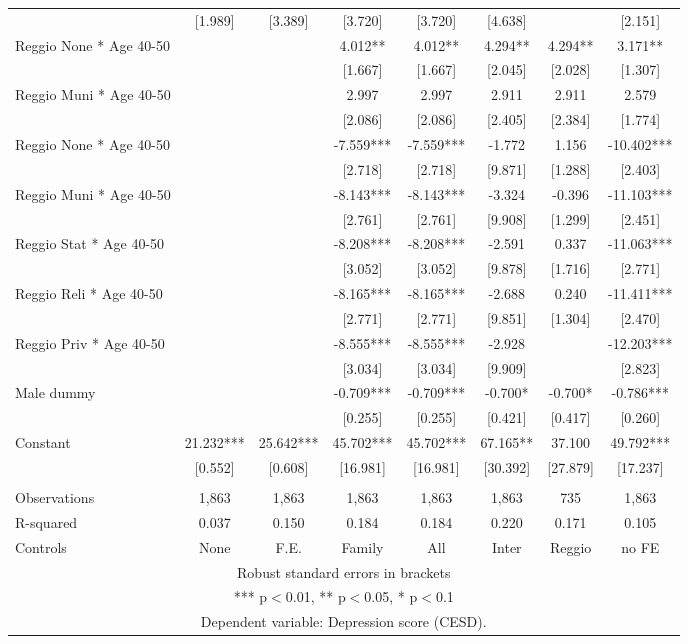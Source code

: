 \begin{tabular}{lccccccc}
 & [1.989] & [3.389] & [3.720] & [3.720] & [4.638] &  & [2.151] \\
Reggio None * Age 40-50 &  &  & 4.012** & 4.012** & 4.294** & 4.294** & 3.171** \\
 &  &  & [1.667] & [1.667] & [2.045] & [2.028] & [1.307] \\
Reggio Muni * Age 40-50 &  &  & 2.997 & 2.997 & 2.911 & 2.911 & 2.579 \\
 &  &  & [2.086] & [2.086] & [2.405] & [2.384] & [1.774] \\
Reggio None * Age 40-50 &  &  & -7.559*** & -7.559*** & -1.772 & 1.156 & -10.402*** \\
 &  &  & [2.718] & [2.718] & [9.871] & [1.288] & [2.403] \\
Reggio Muni * Age 40-50 &  &  & -8.143*** & -8.143*** & -3.324 & -0.396 & -11.103*** \\
 &  &  & [2.761] & [2.761] & [9.908] & [1.299] & [2.451] \\
Reggio Stat * Age 40-50 &  &  & -8.208*** & -8.208*** & -2.591 & 0.337 & -11.063*** \\
 &  &  & [3.052] & [3.052] & [9.878] & [1.716] & [2.771] \\
Reggio Reli * Age 40-50 &  &  & -8.165*** & -8.165*** & -2.688 & 0.240 & -11.411*** \\
 &  &  & [2.771] & [2.771] & [9.851] & [1.304] & [2.470] \\
Reggio Priv * Age 40-50 &  &  & -8.555*** & -8.555*** & -2.928 &  & -12.203*** \\
 &  &  & [3.034] & [3.034] & [9.909] &  & [2.823] \\
Male dummy &  &  & -0.709*** & -0.709*** & -0.700* & -0.700* & -0.786*** \\
 &  &  & [0.255] & [0.255] & [0.421] & [0.417] & [0.260] \\
Constant & 21.232*** & 25.642*** & 45.702*** & 45.702*** & 67.165** & 37.100 & 49.792*** \\
 & [0.552] & [0.608] & [16.981] & [16.981] & [30.392] & [27.879] & [17.237] \\
 &  &  &  &  &  &  &  \\
Observations & 1,863 & 1,863 & 1,863 & 1,863 & 1,863 & 735 & 1,863 \\
R-squared & 0.037 & 0.150 & 0.184 & 0.184 & 0.220 & 0.171 & 0.105 \\
 Controls & None & F.E. & Family & All & Inter & Reggio & no FE \\ \hline
\multicolumn{8}{c}{ Robust standard errors in brackets} \\
\multicolumn{8}{c}{ *** p$<$0.01, ** p$<$0.05, * p$<$0.1} \\
\multicolumn{8}{c}{ Dependent variable: Depression score (CESD).} \\
\end{tabular}
